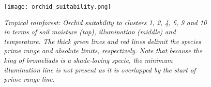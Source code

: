 \begin{figure}[htb!]
\center
	\texttt{[image: orchid\_suitability.png]}
	\caption{ \textit{Tropical rainforest: Orchid suitability to clusters 1, 2, 4, 6, 9 and 10 in terms of soil moisture (top), illumination (middle) and temperature. The thick green lines and red lines delimit the species prime range and absolute limits, respectively. Note that because the king of bromeliads is a shade-loving specie, the minimum illumination line is not present as it is overlapped by the start of prime range line.}}
	\label{fig:results_tropical_orchid_suitability}
\end{figure}